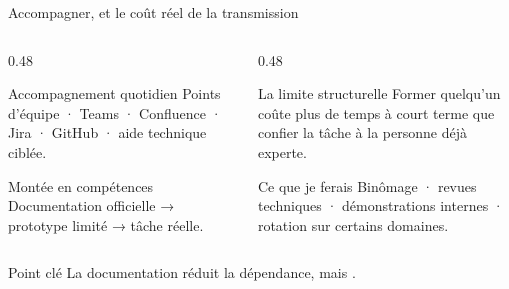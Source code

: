 \begin{frame}{Accompagner, et le coût réel de la transmission}
\begin{columns}[T]
\begin{column}{0.48\linewidth}
\begin{block}{Accompagnement quotidien}
\small Points d'équipe · Teams · Confluence · Jira · GitHub · aide technique ciblée.
\end{block}
\begin{block}{Montée en compétences}
\small Documentation officielle → prototype limité → tâche réelle.
\end{block}
\end{column}
\begin{column}{0.48\linewidth}
\begin{block}{La limite structurelle}
\small Former quelqu'un coûte plus de temps à court terme que confier la tâche à la personne déjà experte.
\end{block}
\begin{block}{Ce que je ferais}
\small Binômage · revues techniques · démonstrations internes · rotation sur certains domaines.
\end{block}
\end{column}
\end{columns}
\vspace{0.55em}
\begin{block}{Point clé}
\centering\small La documentation réduit la dépendance, mais .
\end{block}
\end{frame}

